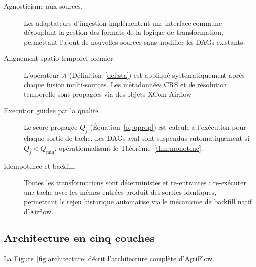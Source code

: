 \documentclass[12pt]{article}
\begin{document}
\begin{description}
	\item[Agnosticisme aux sources.]
	Les adaptateurs d'ingestion implémentent une interface commune
	découplant la gestion des formats de la logique de transformation,
	permettant l'ajout de nouvelles sources sans modifier les DAGs existants.
	\item[Alignement spatio-temporel premier.]
	L’opérateur $\mathcal{A}$ (Définition~\ref{def:sta}) est appliqué
	systématiquement après chaque fusion multi-sources. Les métadonnées
	CRS et de résolution temporelle sont propagées via des objets XCom Airflow.
	\item[Execution guidee par la qualite.]
	Le score propagée $Q_j$ (Équation~\ref{eq:qprop}) est calcule a
	l’exécution pour chaque sortie de tache. Les DAGs aval sont suspendus
	automatiquement si $Q_j < Q_{\min}$, opérationnalisant le
	Théorème~\ref{thm:monotone}.
	\item[Idempotence et backfill.]
	Toutes les transformations sont déterministes et re-entrantes :
	re-exécuter une tache avec les mêmes entrées produit des sorties
	identiques, permettant le rejeu historique automatise via
	le mécanisme de backfill natif d'Airflow.
\end{description}
\subsection{Architecture en cinq couches}

La Figure~\ref{fig:architecture} décrit l'architecture complète d'AgriFlow.
\end{document}
